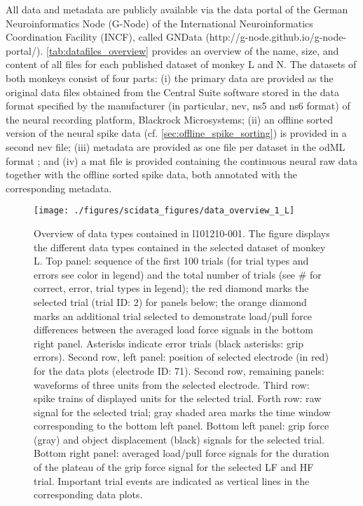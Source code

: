 {All data and metadata are publicly available via the data portal of the German Neuroinformatics Node (G-Node) of the International Neuroinformatics Coordination Facility (INCF), called GNData (http://g-node.github.io/g-node-portal/). \cref{tab:datafiles_overview} provides an overview of the name, size, and content of all files for each published dataset of monkey L and N. The datasets of both monkeys consist of four parts: (i) the primary data are provided as the original data files obtained from the Central Suite software stored in the data format specified by the manufacturer (in particular, nev, ns5 and ns6 format) of the neural recording platform, Blackrock Microsystems; (ii) an offline sorted version of the neural spike data (cf. \cref{sec:offline_spike_sorting}) is provided in a second nev file; (iii) metadata are provided as one file per dataset in the odML format \citep{Grewe_2011, Zehl_2016}; and (iv) a mat file is provided containing the continuous neural raw data together with the offline sorted spike data, both annotated with the corresponding metadata.

\begin{figure}
 \texttt{[image: ./figures/scidata\_figures/data\_overview\_1\_L]}
 \caption[Overview of data types contained in l101210-001]{Overview of data types contained in l101210-001. The figure displays the different data types contained in the selected dataset of monkey L. Top panel: sequence of the first 100 trials (for trial types and errors see color in legend) and the total number of trials (see \# for correct, error, trial types in legend); the red diamond marks the selected trial (trial ID: 2) for panels below; the orange diamond marks an additional trial selected to demonstrate load/pull force differences between the averaged load force signals in the bottom right panel. Asterisks indicate error trials (black asterisks: grip errors). Second row, left panel: position of selected electrode (in red) for the data plots (electrode ID: 71). Second row, remaining panels: waveforms of three units from the selected electrode. Third row: spike trains of displayed units for the selected trial. Forth row: raw signal for the selected trial; gray shaded area marks the time window corresponding to the bottom left panel. Bottom left panel: grip force (gray) and object displacement (black) signals for the selected trial. Bottom right panel: averaged load/pull force signals for the duration of the plateau of the grip force signal for the selected LF and HF trial. Important trial events are indicated as vertical lines in the corresponding data plots.}
 \label{fig:overview_data_l_1}
\end{figure}

}

